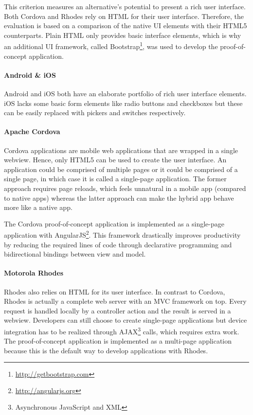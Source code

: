 This criterion measures an alternative's potential to present a rich user interface. Both Cordova and Rhodes rely on HTML for their user interface. Therefore, the evaluation is based on a comparison of the native UI elements with their HTML5 counterparts. Plain HTML only provides basic interface elements, which is why an additional UI framework, called Bootstrap\footnote{\url{http://getbootstrap.com}}, was used to develop the proof-of-concept application. 

\paragraph{Android \& iOS} Android and iOS both have an elaborate portfolio of rich user interface elements. iOS lacks some basic form elements like radio buttons and checkboxes but these can be easily replaced with pickers and switches respectively.

\paragraph{Apache Cordova} Cordova applications are mobile web applications that are wrapped in a single webview. Hence, only HTML5 can be used to create the user interface. An application could be comprised of multiple pages or it could be comprised of a single page, in which case it is called  a single-page application. The former approach requires page reloads, which feels unnatural in a mobile app (compared to native apps) whereas the latter approach can make the hybrid app behave more like a native app. 

The Cordova proof-of-concept application is implemented as a single-page application with AngularJS\footnote{\url{http://angularjs.org}}. This framework drastically improves productivity by reducing the required lines of code through declarative programming and bidirectional bindings between view and model. 

\paragraph{Motorola Rhodes} Rhodes also relies on HTML for its user interface. In contrast to Cordova, Rhodes is actually a complete web server with an MVC framework on top. Every request is handled locally by a controller action and the result is served in a webview. Developers can still choose to create single-page applications but device integration has to be realized through AJAX\footnote{Asynchronous JavaScript and XML} calls, which requires extra work. The proof-of-concept application is implemented as a multi-page application because this is the default way to develop applications with Rhodes.

